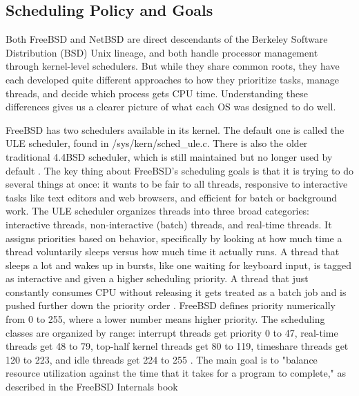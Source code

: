 \subsection{Scheduling Policy and Goals}
Both FreeBSD and NetBSD are direct descendants of the Berkeley Software Distribution (BSD) Unix lineage, and both handle processor management through kernel-level schedulers. But while they share common roots, they have each developed quite different approaches to how they prioritize tasks, manage threads, and decide which process gets CPU time. Understanding these differences gives us a clearer picture of what each OS was designed to do well.

FreeBSD has two schedulers available in its kernel. The default one is called the ULE scheduler, found in /sys/kern/sched\_ule.c. There is also the older traditional 4.4BSD scheduler, which is still maintained but no longer used by default \parencite{watson2015}. The key thing about FreeBSD's scheduling goals is that it is trying to do several things at once: it wants to be fair to all threads, responsive to interactive tasks like text editors and web browsers, and efficient for batch or background work.
The ULE scheduler organizes threads into three broad categories: interactive threads, non-interactive (batch) threads, and real-time threads. It assigns priorities based on behavior, specifically by looking at how much time a thread voluntarily sleeps versus how much time it actually runs. A thread that sleeps a lot and wakes up in bursts, like one waiting for keyboard input, is tagged as interactive and given a higher scheduling priority. A thread that just constantly consumes CPU without releasing it gets treated as a batch job and is pushed further down the priority order \parencite{watson2015}.
FreeBSD defines priority numerically from 0 to 255, where a lower number means higher priority. The scheduling classes are organized by range: interrupt threads get priority 0 to 47, real-time threads get 48 to 79, top-half kernel threads get 80 to 119, timeshare threads get 120 to 223, and idle threads get 224 to 255 \parencite{watson2015}. The main goal is to "balance resource utilization against the time that it takes for a program to complete," as described in the FreeBSD Internals book \parencite{watson2015}

